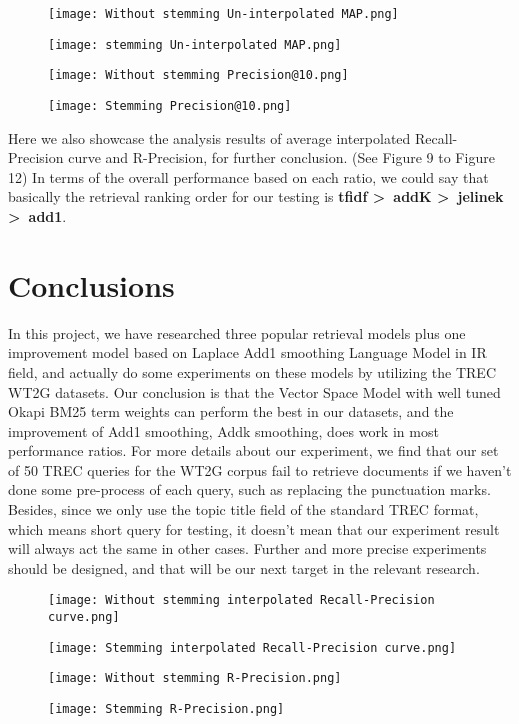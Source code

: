 \documentclass{article}
\begin{document}
\begin{figure}[!htp]
        \texttt{[image: Without stemming Un-interpolated MAP.png]}
        \caption{}
    \endminipage\hfill
        \centering
        \texttt{[image: stemming Un-interpolated MAP.png]}
        \caption{}
    \endminipage\hfill
        \texttt{[image: Without stemming Precision@10.png]}
        \caption{}
    \endminipage\hfill
        \centering
        \texttt{[image: Stemming Precision@10.png]}
        \caption{}
    \endminipage
\end{figure}


Here we also showcase the analysis results of average interpolated Recall-Precision curve and R-Precision, for further conclusion. (See Figure 9 to Figure 12) In terms of the overall performance based on each ratio, we could say that basically the retrieval ranking order for our testing is \textbf{tfidf \textgreater\ addK \textgreater\ jelinek \textgreater\ add1}.

\section{Conclusions}
In this project, we have researched three popular retrieval models plus one improvement model based on Laplace Add1 smoothing Language Model in IR field, and actually do some experiments on these models by utilizing the TREC WT2G datasets. Our conclusion is that the Vector Space Model with well tuned Okapi BM25 term weights can perform the best in our datasets, and the improvement of Add1 smoothing, Addk smoothing, does work in most performance ratios. For more details about our experiment, we find that our set of 50 TREC queries for the WT2G corpus fail to retrieve documents if we haven’t done some pre-process of each query, such as replacing the punctuation marks. Besides, since we only use the topic title field of the standard TREC format, which means short query for testing, it doesn’t mean that our experiment result will always act the same in other cases. Further and more precise experiments should be designed, and that will be our next target in the relevant research.

\begin{figure}[!htp]
        \texttt{[image: Without stemming interpolated Recall-Precision curve.png]}
        \caption{}
    \endminipage\hfill
        \centering
        \texttt{[image: Stemming interpolated Recall-Precision curve.png]}
        \caption{}
    \endminipage\hfill
        \texttt{[image: Without stemming R-Precision.png]}
        \caption{}
    \endminipage\hfill
        \centering
        \texttt{[image: Stemming R-Precision.png]}
        \caption{}
    \endminipage
\end{figure}
\end{document}
